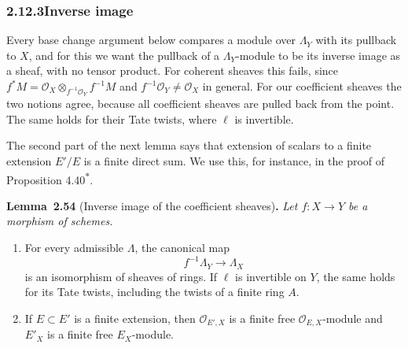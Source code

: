 \documentclass[11pt]{article}
\newenvironment{bpstatement}[2]{\par\addvspace{0.6\baselineskip}\noindent\textbf{#1}#2\textbf{.}\enspace\ignorespaces}
  {\par\addvspace{0.4\baselineskip}}
\newenvironment{bpstatementit}[2]{\begin{bpstatement}{#1}{#2}\itshape\ignorespaces}{\end{bpstatement}}
\newcommand{\bpout}[1]{#1\textsuperscript{\hyperlink{bp-outside}{\ensuremath{\ast}}}}
\begin{document}
\subsubsection*{\texorpdfstring{2.12.3\quad Inverse image}{2.12.3 Inverse image}}
\label{bp163}%
\label{bp164}%
Every base change argument below compares a module over \(\Lambda_Y\) with its pullback to \(X\), and for this we want the pullback of a \(\Lambda_Y\)-module to be its inverse image as a sheaf, with no tensor product. For coherent sheaves this fails, since \(f^*M=\mathcal O_X\otimes_{f^{-1}\mathcal O_Y}f^{-1}M\) and \(f^{-1}\mathcal O_Y\ne\mathcal O_X\) in general. For our coefficient sheaves the two notions agree, because all coefficient sheaves are pulled back from the point. The same holds for their Tate twists, where \(\ell\) is invertible.

The second part of the next lemma says that extension of scalars to a finite extension \(E'/E\) is a finite direct sum. We use this, for instance, in the proof of Proposition \bpout{4.40}.

\label{bp165}%
\begin{bpstatementit}{Lemma~2.54}{ (Inverse image of the coefficient sheaves)}
Let \(f:X\to Y\) be a morphism of schemes.

\begin{enumerate}
\item For every admissible \(\Lambda\), the canonical map \[
   f^{-1}\Lambda_Y\longrightarrow\Lambda_X
   \] is an isomorphism of sheaves of rings. If \(\ell\) is invertible on \(Y\), the same holds for its Tate twists, including the twists of a finite ring \(A\).
\item If \(E\subset E'\) is a finite extension, then \(\mathcal O_{E',X}\) is a finite free \(\mathcal O_{E,X}\)-module and \(E'_X\) is a finite free \(E_X\)-module.
\end{enumerate}
\end{bpstatementit}
\end{document}
